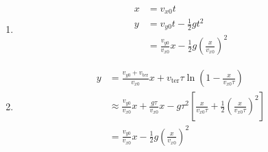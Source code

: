 \documentclass{article}
\begin{document}
\begin{enumerate}
  \item

        \begin{align*}
          x & = v_{x0} t                                                                  \\
          y & = v_{y0} t- \frac{1}{2} g t^2                                               \\
            & = \frac{v_{y0}}{v_{x0}} x - \frac{1}{2} g \left( \frac{x}{v_{x0}} \right)^2
        \end{align*}

  \item

        \begin{align*}
          y & = \frac{v_{y0} + v_\text{ter}}{v_{x0}} x + v_\text{ter} \tau \ln \left( 1 - \frac{x}{v_{x0} \tau} \right)                                                      \\
            & \approx \frac{v_{y0}}{v_{x0}} x + \frac{g \tau}{v_{x0}} x - g \tau^2 \left[ \frac{x}{v_{x0} \tau} + \frac{1}{2} \left( \frac{x}{v_{x0} \tau} \right)^2 \right] \\
            & = \frac{v_{y0}}{v_{x0}} x - \frac{1}{2} g \left( \frac{x}{v_{x0}} \right)^2
        \end{align*}
\end{enumerate}


\setcounter{subsection}{22}
\subsection{}
\end{document}
